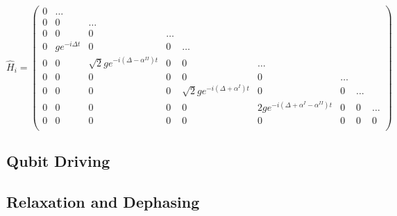 \begin{equation}
\hat{H}_i = \left(
			\begin{array}{lllllllll}
				0 & \hdots \\
				0 & 0 & \hdots \\
				0 & 0 & 0 & \hdots \\
				0 & ge^{-i\Delta t} & 0 & 0 & \hdots  \\
				0 & 0 & \sqrt{2}ge^{-i(\Delta-\alpha^{II}) t} & 0 & 0 & \hdots  \\
				0 & 0 & 0 & 0 & 0 & 0 & \hdots \\
				0 & 0 & 0 & 0 & \sqrt{2}ge^{-i(\Delta+\alpha^I) t} & 0 & 0 & \hdots \\
				0 & 0 & 0 & 0 & 0 & 2ge^{-i(\Delta+\alpha^{I}-\alpha^{II}) t} & 0 & 0 & \hdots \\
				0 & 0 & 0 & 0 & 0 & 0 & 0 & 0 & 0 \\
			\end{array}
		\right)
\end{equation}
%
\subsection{Qubit Driving}

\subsection{Relaxation and Dephasing}

